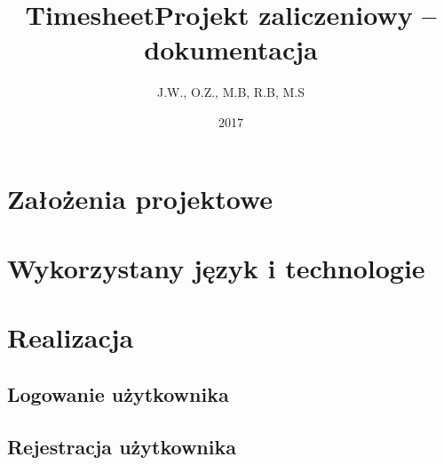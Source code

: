 \documentclass[a4paper, 12pt, oneside]{article}
\title{\textbf{Timesheet}\linebreak Projekt zaliczeniowy -- dokumentacja}
\author{J.W., O.Z., M.B, R.B, M.S}
\date{2017}
\begin{document}

\maketitle
\thispagestyle{empty}

\newpage


\tableofcontents
\newpage


\section{Założenia projektowe}
\section{Wykorzystany język i technologie}
\section{Realizacja}
	\subsection{Logowanie użytkownika}
	\subsection{Rejestracja użytkownika}
\end{document}
